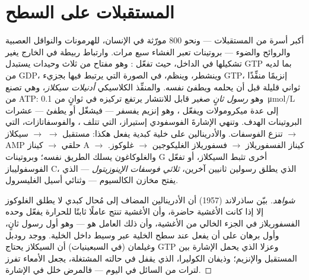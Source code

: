 \section{المستقبلات على السطح}

\begin{proposition}\label{prop:b2:cell-signalling:gpcr}
أكبر أسرة من المستقبلات --- ونحو \num{800} مورّثة في الإنسان،
للهرمونات والنواقل العصبية والروائح والضوء --- بروتينات
تعبر الغشاء سبع مرات. وارتباط ربيطة في الخارج يغير
تشكيلها في الداخل، حيث تفعّل \emph{}: وهو
مفتاح من ثلاث وحيدات يستبدل GTP بما لديه من GDP، وينشطر،
وينظم، في الصورة التي يرتبط فيها بجزيء GTP، إنزيمًا منفِّذًا ثواني قليلة
قبل أن يحلمه ويطفئ نفسه. والمنفِّذ الكلاسيكي
\emph{أدنيلات سيكلاز}، وهي تصنع \emph{}
من ATP: وهو \emph{رسول ثانٍ} صغير قابل للانتشار يرتفع
تركيزه في ثوانٍ من \qty{0.1}{\micro mol/L} إلى
عدة ميكرومولات ويفعّل \emph{}، وهو
إنزيم يفسفر --- فيشغّل أو يطفئ --- عشرات
البروتينات الهدف. وتنهي الإشارةَ الفوسفودي إستيراز، التي
تتلف ، والفوسفاتازات، التي تنزع الفوسفات.
والأدرينالين على خلية كبدية يفعل هكذا: مستقبل $\to$ 
$\to$ سيكلاز $\to$ AMP حلقي $\to$ كيناز A $\to$ كيناز الفسفوريلاز
$\to$ فسفوريلاز الغليكوجين $\to$ غلوكوز. والغلوكاغون يسلك الطريق
نفسه؛ وبروتينات G أخرى تثبط السيكلاز، أو تفعّل
الفوسفوليباز C، الذي يطلق رسولين ثانيين آخرين،
\emph{ثلاثي فوسفات الإينوزيتول} --- الذي يفتح مخازن الكالسيوم ---
وثنائي أسيل الغليسرول.
\end{proposition}
\begin{proof}[شواهد]
بيّن ساذرلاند (1957) أن الأدرينالين المضاف إلى مُحال كبدي
لا يطلق الغلوكوز إلا إذا كانت الأغشية حاضرة، وأن
الأغشية تنتج عاملًا ثابتًا للحرارة يفعّل وحده
الفسفوريلاز في الجزء الخالي من الأغشية، وأن ذلك العامل هو
 --- وهو أول رسول ثانٍ، وأول
برهان على أن  يفعل عند سطح الخلية عبر
وسيط داخل الخلية. ووجد رودبل وغيلمان (في السبعينيات) أن
السيكلاز يحتاج GTP وعزلا  الذي يحمل
الإشارة بين المستقبل والإنزيم؛ وذيفان الكوليرا، الذي يقفل
 في حالته المشتغلة، يجعل الأمعاء تفرز لترات من السائل
في اليوم --- فالمرض خلل في الإشارة.
\end{proof}

